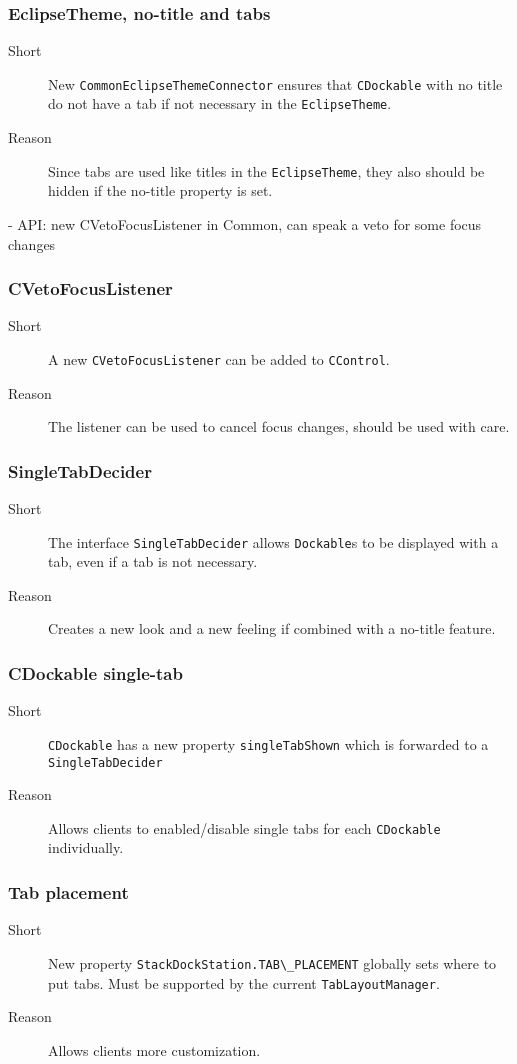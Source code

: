 \documentclass[a4paper,10pt]{article}
\newcommand{\src}[1]{\lstinline[basicstyle=\normalsize\ttfamily,keywordstyle=\normalsize\ttfamily,identifierstyle=\normalsize\ttfamily]|#1|}
\newcommand{\short}{\item[Short]}
\newcommand{\why}{\item[Reason]}
\begin{document}
\subsubsection{EclipseTheme, no-title and tabs}
\begin{description}
 \short New \src{CommonEclipseThemeConnector} ensures that \src{CDockable} with no title do not have a tab if not necessary in the \src{EclipseTheme}.
 \why Since tabs are used like titles in the \src{EclipseTheme}, they also should be hidden if the no-title property is set.
\end{description}

- API: new CVetoFocusListener in Common, can speak a veto for some focus changes
\subsubsection{CVetoFocusListener}
\begin{description}
 \short A new \src{CVetoFocusListener} can be added to \src{CControl}.
 \why The listener can be used to cancel focus changes, should be used with care.
\end{description}

\subsubsection{SingleTabDecider}
\begin{description}
 \short The interface \src{SingleTabDecider} allows \src{Dockable}s to be displayed with a tab, even if a tab is not necessary.
 \why Creates a new look and a new feeling if combined with a no-title feature.
\end{description}

\subsubsection{CDockable single-tab}
\begin{description}
 \short \src{CDockable} has a new property \src{singleTabShown} which is forwarded to a \src{SingleTabDecider}
 \why Allows clients to enabled/disable single tabs for each \src{CDockable} individually.
\end{description}

\subsubsection{Tab placement}
\begin{description}
 \short New property \src{StackDockStation.TAB\_PLACEMENT} globally sets where to put tabs. Must be supported by the current \src{TabLayoutManager}.
 \why Allows clients more customization.
\end{description}
\end{document}
